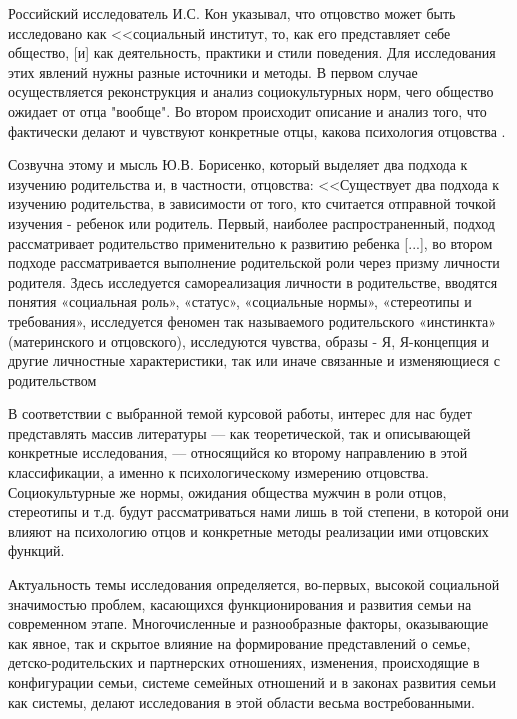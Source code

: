 \documentclass{../../common/thesisbyxetex}
\begin{document}
Российский исследователь И.С. Кон указывал, что отцовство может быть исследовано как <<социальный
институт, то, как его представляет себе общество, [и]  как деятельность, практики и
стили поведения. Для исследования этих явлений нужны разные источники и методы. В первом случае
осуществляется реконструкция и анализ социокультурных норм, чего общество ожидает от отца "вообще".
Во втором происходит описание и анализ того, что фактически делают и чувствуют конкретные отцы,
какова психология отцовства \cite[3]{konot}.

Созвучна этому и мысль Ю.В. Борисенко, который выделяет два подхода к изучению родительства и, в
частности, отцовства: <<Существует два подхода к изучению родительства, в зависимости от того, кто
считается отправной точкой изучения - ребенок или родитель. Первый, наиболее распространенный,
подход рассматривает родительство применительно к развитию ребенка [...], во втором подходе
рассматривается выполнение родительской роли через призму личности родителя. Здесь исследуется
самореализация личности в родительстве, вводятся понятия «социальная роль», «статус», «социальные
нормы», «стереотипы и требования», исследуется феномен так называемого родительского «инстинкта»
(материнского и отцовского), исследуются чувства, образы - Я, Я-концепция и другие личностные
характеристики, так или иначе связанные и изменяющиеся с родительством \cite[11]{psyot}

В соответствии с выбранной темой курсовой работы, интерес для нас будет представлять массив
литературы --- как теоретической, так и описывающей конкретные исследования, --- относящийся ко
второму направлению в этой классификации, а именно к психологическому измерению отцовства.
Социокультурные же нормы, ожидания общества мужчин в роли отцов, стереотипы и т.д. будут
рассматриваться нами лишь в той степени, в которой они влияют на психологию отцов и конкретные
методы реализации ими отцовских функций.

Актуальность темы исследования определяется, во-первых, высокой социальной значимостью проблем,
касающихся функционирования и развития семьи на современном этапе. Многочисленные и разнообразные
факторы, оказывающие как явное, так и скрытое влияние на формирование представлений о семье,
детско-родительских и партнерских отношениях, изменения, происходящие в конфигурации семьи, системе
семейных отношений и в законах развития семьи как системы, делают исследования в этой области
весьма востребованными.
\end{document}
